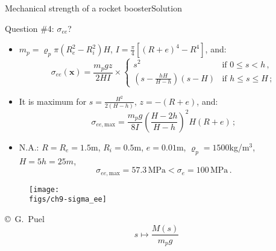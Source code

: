 \documentclass{beamer}
\newcommand{\xj}{x}
\newcommand{\zj}{z}
\newcommand{\xv}{{\boldsymbol\xj}}
\newcommand{\roi}{\varrho}
\newcommand*{\stressj}{\sigma}
\newcommand{\Mresj}{M}
\begin{document}
\begin{frame}{Mechanical strength of a rocket booster}{Solution}
\begin{overprint}
\vskip-20pt
\begin{exampleblock}{Question \#4: $\stressj_{ee}$?}
\begin{itemize}
\item $m_p=\roi_p\pi(R_e^2-R_i^2)H$, $I=\frac{\pi}{4}[(R+e)^4-R^4]$, and:
\begin{displaymath}
\stressj_{ee}(\xv) =\frac{m_p g\zj}{2HI}\times\left\{\begin{array}{ll}
\scriptstyle s^2 & \scriptstyle\text{if $0\leq s < h$}\,,\\
\scriptstyle \left(s-\frac{hH}{H-h}\right)(s-H) & \scriptstyle\text{if $h\leq s \leq H$}\,;
\end{array}\right.
\end{displaymath}
\item It is maximum for $s=\frac{H^2}{2(H-h)}$, $\zj=-(R+e)$, and:
\begin{displaymath}
\stressj_{ee,\text{max}}=\frac{m_p g}{8I}\left(\frac{H-2h}{H-h}\right)^2H(R+e)\,;
\end{displaymath}
\item N.A.: $R=R_e=1.5$m, $R_i=0.5$m, $e=0.01$m, $\roi_p=1500$kg/m$^3$, $H=5h=25m$,
\begin{displaymath}
\stressj_{ee,\text{max}}=57.3\,\text{MPa}<\stressj_e=100\,\text{MPa}\,.
\end{displaymath}
\end{itemize}
\end{exampleblock}

\begin{figure}
\centering\texttt{[image: \\figs/ch9-sigma\_ee]}
\end{figure}
\vskip-20pt{\hspace{6.7truecm}\mbox{\tiny{\copyright\ G. Puel}}}
\begin{displaymath}
s\mapsto\frac{\Mresj(s)}{m_pg}
\end{displaymath}

\end{overprint}

\end{frame}

%
%

\end{document}
